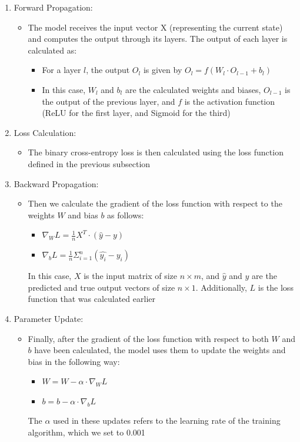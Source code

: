 \documentclass[11pt]{article}
\begin{document}
\begin{enumerate}
    \item Forward Propagation:
    \begin{itemize}
        \item The model receives the input vector X (representing the current state) and computes the output through its layers. The output of each layer is calculated as:
        \begin{itemize}
            \item For a layer $l$, the output $O_l$ is given by $O_l = f(W_l \cdot O_{l - 1} + b_l)$
            \item In this case, $W_l$ and $b_l$ are the calculated weights and biases, $O_{l - 1}$ is the output of the previous layer, and $f$ is the activation function (ReLU for the first layer, and Sigmoid for the third)
        \end{itemize}
    \end{itemize}
    \item Loss Calculation:
    \begin{itemize}
        \item The binary cross-entropy loss is then calculated using the loss function defined in the previous subsection
    \end{itemize}
    \item Backward Propagation:
    \begin{itemize}
        \item Then we calculate the gradient of the loss function with respect to the weights $W$ and bias $b$ as follows:
        \begin{itemize}
            \item $\nabla_{W} L = \frac{1}{n} X^{T} \cdot (\hat{y} - y)$
            \item $\nabla_{b} L = \frac{1}{n} \Sigma_{i=1}^{n} (\hat{y_i} - y_i)$
        \end{itemize}
        In this case, $X$ is the input matrix of size $n \times m$, and $\hat{y}$ and $y$ are the predicted and true output vectors of size $n \times 1$. Additionally, $L$ is the loss function that was calculated earlier
    \end{itemize}
    \item Parameter Update:
    \begin{itemize}    
        \item Finally, after the gradient of the loss function with respect to both $W$ and $b$ have been calculated, the model uses them to update the weights and bias in the following way:
        \begin{itemize}
            \item $W = W - \alpha \cdot \nabla_{W} L$
            \item $b = b - \alpha \cdot \nabla_{b} L$
        \end{itemize}
        The $\alpha$ used in these updates refers to the learning rate of the training algorithm, which we set to 0.001
    \end{itemize}
\end{enumerate}
\end{document}
